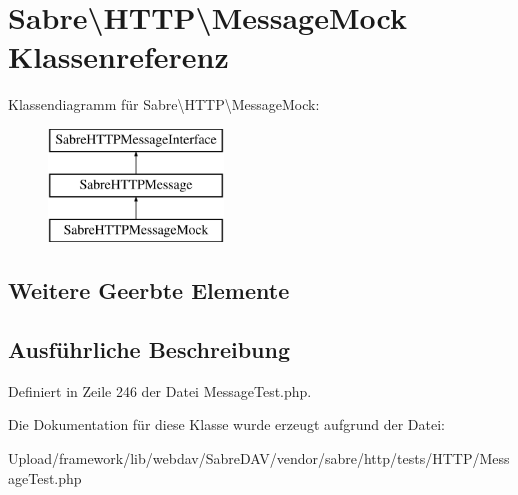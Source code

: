 \hypertarget{class_sabre_1_1_h_t_t_p_1_1_message_mock}{}\section{Sabre\textbackslash{}H\+T\+TP\textbackslash{}Message\+Mock Klassenreferenz}
\label{class_sabre_1_1_h_t_t_p_1_1_message_mock}
Klassendiagramm für Sabre\textbackslash{}H\+T\+TP\textbackslash{}Message\+Mock\+:\begin{figure}[H]
\begin{center}
\leavevmode
\includegraphics[height=3.000000cm]{class_sabre_1_1_h_t_t_p_1_1_message_mock}
\end{center}
\end{figure}
\subsection*{Weitere Geerbte Elemente}


\subsection{Ausführliche Beschreibung}


Definiert in Zeile 246 der Datei Message\+Test.\+php.



Die Dokumentation für diese Klasse wurde erzeugt aufgrund der Datei\+:\begin{DoxyCompactItemize}
\item 
Upload/framework/lib/webdav/\+Sabre\+D\+A\+V/vendor/sabre/http/tests/\+H\+T\+T\+P/Message\+Test.\+php\end{DoxyCompactItemize}
